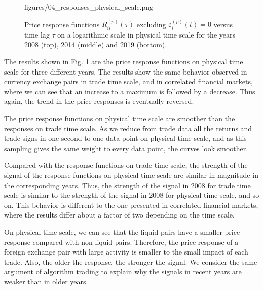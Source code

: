 \begin{figure}[htbp]
    {figures/04_responses_physical_scale.png}
    \caption{Price response functions
             $R^{\left(p\right)}_{ii}\left(\tau\right)$ excluding
             $\varepsilon^{\left(p\right)}_{i}\left(t\right) = 0$ versus time
             lag $\tau$ on a logarithmic scale in physical time scale for the
             years 2008 (top), 2014 (middle) and 2019 (bottom).}
    \label{fig:response_function_physical_scale}
\end{figure}

The results shown in Fig. \ref{fig:response_function_physical_scale} are the
price response functions on physical time scale for three different years. The
results show the same behavior observed in currency exchange pairs in trade
time scale, and in correlated financial markets, where we can see that an
increase to a maximum is followed by a decrease. Thus again, the trend in the
price responses is eventually reversed.

The price response functions on physical time scale are smoother than the
responses on trade time scale. As we reduce from trade data all the returns and
trade signs in one second to one data point on physical time scale, and as this
sampling gives the same weight to every data point, the curves look smoother.

Compared with the response functions on trade time scale, the strength of the
signal of the response functions on physical time scale are similar in
magnitude in the corresponding years. Thus, the strength of the signal in 2008
for trade time scale is similar to the strength of the signal in 2008 for
physical time scale, and so on. This behavior is different to the one presented
in correlated financial markets, where the results differ about a factor of
two depending on the time scale.

On physical time scale, we can see that the liquid pairs have a smaller price
response compared with non-liquid pairs. Therefore, the price response of a
foreign exchange pair with large activity is smaller to the small impact of
each trade. Also, the older the response, the stronger the signal. We consider
the same argument of algorithm trading to explain why the signals in recent
years are weaker than in older years.
